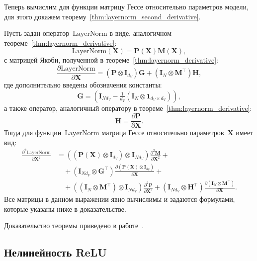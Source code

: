 Теперь вычислим для функции матрицу Гессе относительно параметров модели, для этого докажем теорему~\ref{thm:layernorm_second_derivative}.
\begin{theorem}\label{thm:layernorm_second_derivative}
    Пусть задан оператор~$\text{LayerNorm}$ в виде, аналогичном теореме~\ref{thm:layernorm_derivative}:
    \[
        \text{LayerNorm}(\mathbf{X}) = \mathbf{P}(\mathbf{X}) \mathbf{M}(\mathbf{X}),
    \]
    с матрицей Якоби, полученной в теореме~\ref{thm:layernorm_derivative}:
    \[
        \frac{\partial \text{LayerNorm}}{\partial \mathbf{X}} = (\mathbf{P} \otimes \mathbf{I}_{d_V}) \mathbf{G} + (\mathbf{I}_{N} \otimes \mathbf{M}^\top) \mathbf{H},
    \]
    где дополнительно введены обозначения константы:
    \[
        \mathbf{G} = \left(\mathbf{I}_{N d_V} - \tfrac{1}{d_V}(\mathbf{I}_{N} \otimes \mathbf{1}_{d_V \times d_V})\right),
    \] а также оператор, аналогичный оператору в теореме~\ref{thm:layernorm_derivative}:
    \[
        \mathbf{H} = \frac{\partial \mathbf{P}}{\partial \mathbf{X}}.
    \]
    Тогда для функции~$\text{LayerNorm}$ матрица Гессе относительно параметров~$\mathbf{X}$ имеет вид:
    \begin{align}\label{chapter-2:theorem:layernorm_second_derivative:eqstemant}
        \frac{\partial^2 \text{LayerNorm}}{\partial \mathbf{X}^2} &= \left( (\mathbf{P}(\mathbf{X}) \otimes \mathbf{I}_{d_V}) \otimes \mathbf{I}_{N d_V} \right)\frac{\partial^2 \mathbf{M}}{\partial \mathbf{X}^2} +\\
        &\quad+\left( \mathbf{I}_{N d_V} \otimes \mathbf{G}^\top \right) \frac{\partial (\mathbf{P}(\mathbf{X}) \otimes \mathbf{I}_{d_V})}{\partial \mathbf{X}} + \\
        &\quad+ \left( (\mathbf{I}_{N} \otimes \mathbf{M}^\top ) \otimes \mathbf{I}_{N d_V} \right) \frac{\partial^2 \mathbf{P}}{\partial \mathbf{X}^2} + \left( \mathbf{I}_{N d_V} \otimes \mathbf{H}^\top \right) \frac{\partial (\mathbf{I}_{N} \otimes \mathbf{M}^\top )}{\partial\mathbf{X}}.
    \end{align}
    Все матрицы в данном выражении явно вычислимы и задаются формулами, которые указаны ниже в доказательстве.
\end{theorem}
Доказательство теоремы приведено в работе~\cite{petrov2025curvaturegap}.

\subsection{Нелинейность ReLU}

